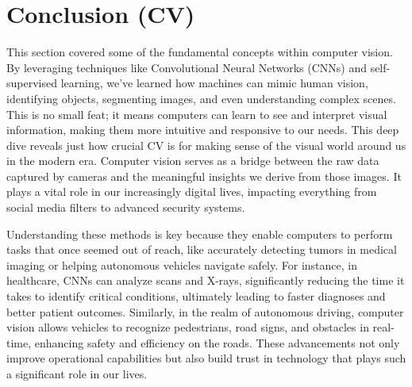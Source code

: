 \section{Conclusion (CV)}
\begin{flushleft}
    \large 
    This section covered some of the fundamental concepts within computer vision. By leveraging techniques like Convolutional Neural Networks (CNNs) and self-supervised learning, we’ve learned how machines can mimic human vision, identifying objects, segmenting images, and even understanding complex scenes. This is no small feat; it means computers can learn to see and interpret visual information, making them more intuitive and responsive to our needs. This deep dive reveals just how crucial CV is for making sense of the visual world around us in the modern era. Computer vision serves as a bridge between the raw data captured by cameras and the meaningful insights we derive from those images. It plays a vital role in our increasingly digital lives, impacting everything from social media filters to advanced security systems.  \break
    
    Understanding these methods is key because they enable computers to perform tasks that once seemed out of reach, like accurately detecting tumors in medical imaging or helping autonomous vehicles navigate safely. For instance, in healthcare, CNNs can analyze scans and X-rays, significantly reducing the time it takes to identify critical conditions, ultimately leading to faster diagnoses and better patient outcomes. Similarly, in the realm of autonomous driving, computer vision allows vehicles to recognize pedestrians, road signs, and obstacles in real-time, enhancing safety and efficiency on the roads. These advancements not only improve operational capabilities but also build trust in technology that plays such a significant role in our lives.
\end{flushleft}
